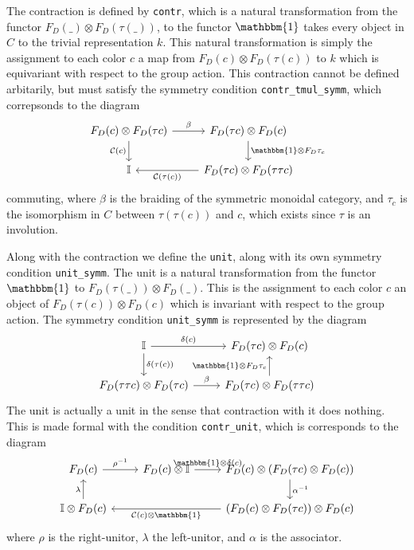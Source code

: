 \documentclass[a4paper, 11pt]{article}
\begin{document}
The contraction is defined by \lstinline|contr|, which is a natural transformation from the functor 
$F_D(\_) \otimes F_D (\tau (\_))$, to the functor $\mathbbm{1}$ takes every object in $C$ to the trivial representation $k$. 
This natural transformation is simply the assignment to each color $c$ a map from 
$F_D(c) \otimes F_D (\tau(c))$ to $k$ which is equivariant with respect to the group action. 
This contraction cannot be defined arbitarily, but must satisfy the symmetry condition \lstinline|contr_tmul_symm|, 
which correpsonds to the diagram 
\begin{equation}
\begin{tikzcd}
  F_D(c) \otimes F_D(\tau c) \arrow[r, "{\beta}"] \arrow[d, "{\mathcal{C}(c)}", swap] & F_D(\tau c) \otimes F_D (c) \arrow[d, "\mathbbm{1} \otimes F_D \tau_c"] \\
  \mathbb{I} & F_D(\tau c) \otimes F_D (\tau \tau c) \arrow[l, "{\mathcal{C}(\tau(c))}", ] 
\end{tikzcd}
\end{equation}
commuting, where $\beta$ is the braiding of the symmetric monoidal category, and $\tau_c$ is the isomorphism
in $C$ between $\tau(\tau(c))$ and $c$, which exists since $\tau$ is an involution.

Along with the contraction we define the \lstinline|unit|, along with its own symmetry condition 
\lstinline|unit_symm|. The unit is a natural transformation from the functor  $\mathbbm{1}$ to 
$F_D(\tau(\_)) \otimes F_D (\_)$. This is the assignment to each color $c$ an object of 
$F_D(\tau(c)) \otimes F_D (c)$ which is invariant with respect to the group action. 
The symmetry condition \lstinline|unit_symm| is represented by the diagram 
\begin{equation} 
  \begin{tikzcd}
    \mathbb{I} \arrow[r, "{\delta(c)}"] \arrow[d, "{\delta(\tau(c))}"] & F_D(\tau c) \otimes F_D(c) \\
    F_D(\tau \tau c) \otimes F_D(\tau c) \arrow[r, "{\beta}"] & F_D(\tau c) \otimes F_D(\tau \tau c) \arrow[u, "{\mathbbm{1} \otimes F_D \tau_c}"]
  \end{tikzcd}
\end{equation} 
The unit is actually a unit in the sense that contraction with it does nothing. This is made formal with the condition 
\lstinline|contr_unit|, which is corresponds to the diagram 
\begin{equation}
  \begin{tikzcd}
    F_D(c) \arrow[r, "{\rho^{-1}}"] &  F_D(c) \otimes \mathbb{I} \arrow[r, "{\mathbbm{1}\otimes \delta(c)}"] & F_D(c) \otimes (F_D (\tau c) \otimes F_D(c)) \arrow[d, "{\alpha^{-1}}"] \\
    \mathbb{I} \otimes F_D(c) \arrow[u, "{\lambda}"] &   &(F_D(c) \otimes F_D(\tau c)) \otimes F_D(c) \arrow[ll, "{\mathcal{C}(c)\otimes \mathbbm{1}}"] 
\end{tikzcd}
\end{equation}
where $\rho$ is the right-unitor, $\lambda$ the left-unitor, and $\alpha$ is the associator. 
\end{document}
